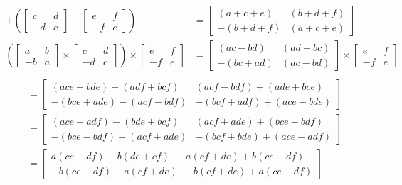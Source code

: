 \documentclass[letterpaper]{article}
\begin{document}
\begin{enumerate}
\begin{enumerate}
\begin{enumerate}
\begin{align*}
        +\left(\left[\begin{array}{rr}c&d\\-d&c\end{array}\right]
        +\left[\begin{array}{rr}e&f\\-f&e\end{array}\right]\right)
        &=\left[\begin{array}{rr}(a+c+e)&(b+d+f)\\-(b+d+f)&(a+c+e)\end{array}\right]\\
        \left(\left[\begin{array}{rr}a&b\\-b&a\end{array}\right]
        \times \left[\begin{array}{rr}c&d\\-d&c\end{array}\right]\right)
        \times \left[\begin{array}{rr}e&f\\-f&e\end{array}\right]
        &=\left[\begin{array}{rr}(ac-bd)&(ad+bc)\\-(bc+ad)&(ac-bd)\end{array}\right]
        \times \left[\begin{array}{rr}e&f\\-f&e\end{array}\right]\\
      \end{align*}
      \begin{align*}
        &=\left[\begin{array}{rr}(ace-bde)-(adf+bcf)&(acf-bdf)+(ade+bce)\\-(bce+ade)-(acf-bdf)&-(bcf+adf)+(ace-bde)\end{array}\right]\\
        &=\left[\begin{array}{rr}(ace-adf)-(bde+bcf)&(acf+ade)+(bce-bdf)\\-(bce-bdf)-(acf+ade)&-(bcf+bde)+(ace-adf)\end{array}\right]\\
        &=\left[\begin{array}{rr}a(ce-df)-b(de+cf)&a(cf+de)+b(ce-df)\\-b(ce-df)-a(cf+de)&-b(cf+de)+a(ce-df)\end{array}\right]\\

\end{align*}
\end{enumerate}
\end{enumerate}
\end{enumerate}
\end{document}
